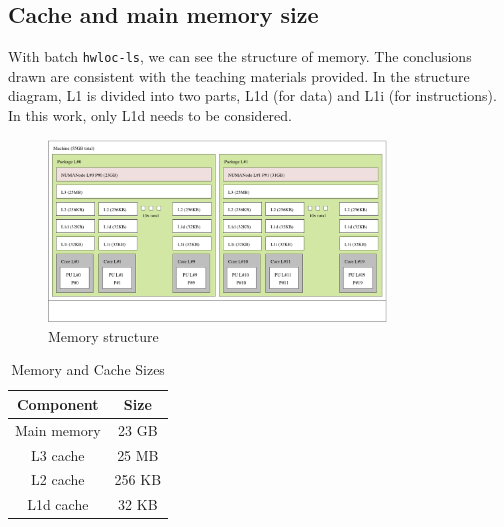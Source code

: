 \documentclass[unicode,11pt,a4paper,oneside,numbers=endperiod,openany]{scrartcl}
\begin{document}
\subsection{Cache and main memory size}
With batch \texttt{hwloc-ls}, we can see the structure of memory. The conclusions drawn are consistent with the teaching materials provided. In the structure diagram, L1 is divided into two parts, L1d (for data) and L1i (for instructions)\cite{L1}. In this work, only L1d needs to be considered.
\begin{figure}[h]
    \centering
    \includegraphics[width=0.8\textwidth]{pictures/XEON_E5-2650.pdf}
    \caption{Memory structure}
\end{figure}

\begin{table}[h]
    \centering
    \begin{tabular}{|c|c|}
        \hline
        \textbf{Component} & \textbf{Size} \\ 
        \hline
        Main memory & 23 GB \\ 
        \hline
        L3 cache & 25 MB \\ 
        \hline
        L2 cache & 256 KB \\ 
        \hline
        L1d cache & 32 KB \\ 
        \hline
    \end{tabular}
    \caption{Memory and Cache Sizes} 
    \label{tab:memory_cache} 
\end{table}
\end{document}
